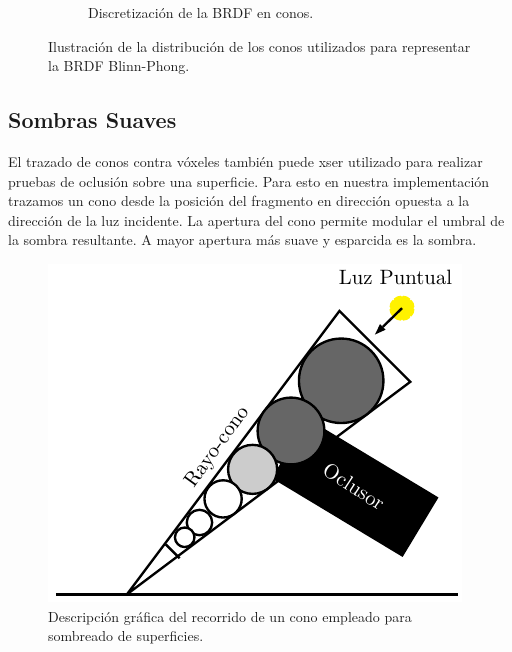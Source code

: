 \begin{figure}[H]
\begin{subfigure}[t]{.32\linewidth}
		\caption*{Discretización de la BRDF en conos.}
	\end{subfigure}%
	\caption{Ilustración de la distribución de los conos utilizados para representar la \ac{BRDF} Blinn-Phong.}
	\label{fig:brdf_cones2}
\end{figure}

\subsection{Sombras Suaves} %
\label{sub:sombras_suaves_con_trazado_de_conos}
El trazado de conos contra vóxeles también puede xser utilizado para realizar pruebas de oclusión sobre una superficie. Para esto en nuestra implementación trazamos un cono desde la posición del fragmento en dirección opuesta a la dirección de la luz incidente. La apertura del cono permite modular el umbral de la sombra resultante. A mayor apertura más suave y esparcida es la sombra.

\begin{figure}[H]
	\centering
	\captionsetup{justification=centering}
	\includegraphics[width=.4\linewidth]{media/shadow_cone.pdf}
	\caption{Descripción gráfica del recorrido de un cono empleado para sombreado de superficies.}
\end{figure}

